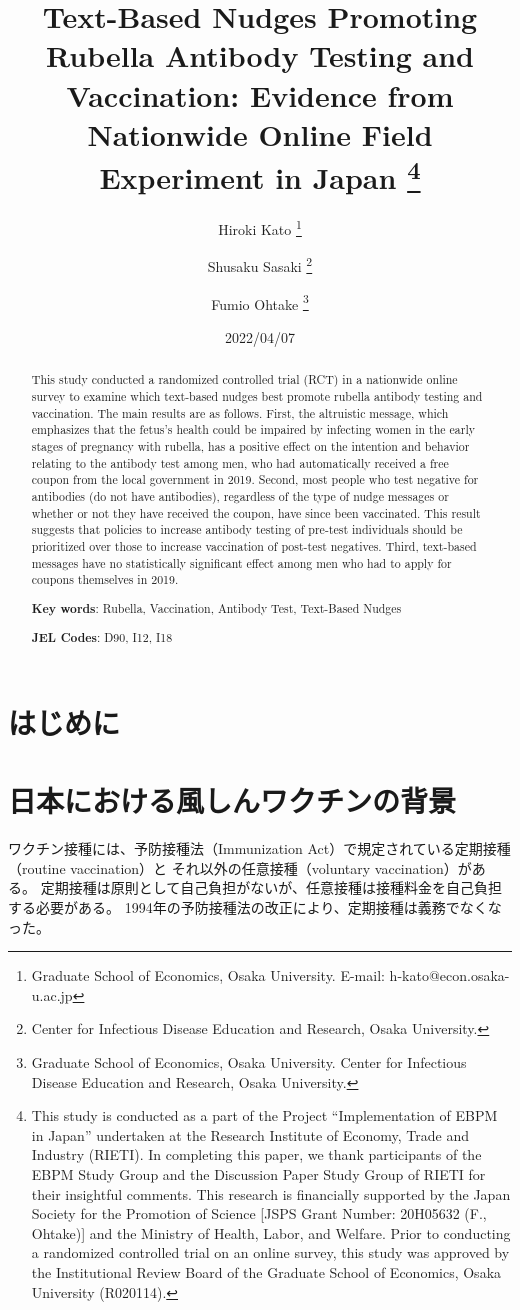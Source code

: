 \documentclass[
  11pt,
  a4paper,
]{article}
\title{Text-Based Nudges Promoting Rubella Antibody Testing and Vaccination:
Evidence from Nationwide Online Field Experiment in Japan  \thanks{This study is conducted as a part of the Project ``Implementation of EBPM in Japan''
undertaken at the Research Institute of Economy, Trade and Industry (RIETI).
In completing this paper,
we thank participants of the EBPM Study Group and
the Discussion Paper Study Group of RIETI for their insightful comments.
This research is financially supported by
the Japan Society for the Promotion of Science
{[}JSPS Grant Number: 20H05632 (F., Ohtake){]}
and the Ministry of Health, Labor, and Welfare.
Prior to conducting a randomized controlled trial on an online survey,
this study was approved by the Institutional Review Board
of the Graduate School of Economics, Osaka University (R020114).}  }
\author{
    Hiroki Kato
  \thanks{Graduate School of Economics, Osaka University. E-mail: h-kato@econ.osaka-u.ac.jp  }
  \and
    Shusaku Sasaki
  \thanks{Center for Infectious Disease Education and Research, Osaka University.  }
  \and
    Fumio Ohtake
  \thanks{Graduate School of Economics, Osaka University.
Center for Infectious Disease Education and Research, Osaka University.  }
  \and
  }
\date{2022/04/07}
\begin{document}
\begin{spacing}{1}
  \maketitle
\end{spacing}
\begin{spacing}{1}
  \begin{abstract}
    This study conducted a randomized controlled trial (RCT) in a nationwide online survey
    to examine which text-based nudges best promote rubella antibody testing and vaccination.
    The main results are as follows.
    First, the altruistic message,
    which emphasizes that the fetus's health could be impaired by
    infecting women in the early stages of pregnancy with rubella,
    has a positive effect on the intention and behavior relating to the antibody test among men,
    who had automatically received a free coupon from the local government in 2019.
    Second, most people who test negative for antibodies (do not have antibodies),
    regardless of the type of nudge messages or whether or not they have received the coupon,
    have since been vaccinated.
    This result suggests that policies to increase antibody testing of pre-test individuals
    should be prioritized over those to increase vaccination of post-test negatives.
    Third, text-based messages have no statistically significant effect
    among men who had to apply for coupons themselves in 2019.
    
                \noindent
    \textbf{Key words}: Rubella, Vaccination, Antibody Test, Text-Based Nudges
        
        \noindent
    \textbf{JEL Codes}: D90, I12, I18
            
  \end{abstract}
\end{spacing}

\hypertarget{intro}{%
\section{はじめに}\label{intro}}

\hypertarget{background}{%
\section{日本における風しんワクチンの背景}\label{background}}

ワクチン接種には、予防接種法（Immunization Act）で規定されている定期接種（routine vaccination）と
それ以外の任意接種（voluntary vaccination）がある。
定期接種は原則として自己負担がないが、任意接種は接種料金を自己負担する必要がある。
1994年の予防接種法の改正により、定期接種は義務でなくなった。
\end{document}
